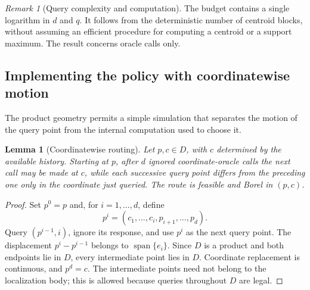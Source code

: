 \documentclass[11pt]{article}
\numberwithin{equation}{section}
\newtheorem{lemma}[lemma]{Lemma}
\theoremstyle{definition}
\theoremstyle{remark}
\newtheorem{remark}[remark]{Remark}
\begin{document}
\begin{remark}[Query complexity and computation]
The budget contains a single logarithm in $d$ and $q$. It follows from the deterministic number of centroid blocks, without assuming an efficient procedure for computing a centroid or a support maximum. The result concerns oracle calls only.
\end{remark}

\subsection{Implementing the policy with coordinatewise motion}

The product geometry permits a simple simulation that separates the motion of the query point from the internal computation used to choose it.

\begin{lemma}[Coordinatewise routing]\label{lem:routing}
Let $p,c\in D$, with $c$ determined by the available history. Starting at $p$, after $d$ ignored coordinate-oracle calls the next call may be made at $c$, while each successive query point differs from the preceding one only in the coordinate just queried. The route is feasible and Borel in $(p,c)$.
\end{lemma}
\begin{proof}
Set $p^0=p$ and, for $i=1,\ldots,d$, define
\[
p^i=(c_1,\ldots,c_i,p_{i+1},\ldots,p_d).
\]
Query $(p^{i-1},i)$, ignore its response, and use $p^i$ as the next query point. The displacement $p^i-p^{i-1}$ belongs to $\operatorname{span}\{e_i\}$. Since $D$ is a product and both endpoints lie in $D$, every intermediate point lies in $D$. Coordinate replacement is continuous, and $p^d=c$. The intermediate points need not belong to the localization body; this is allowed because queries throughout $D$ are legal.
\end{proof}
\end{document}
